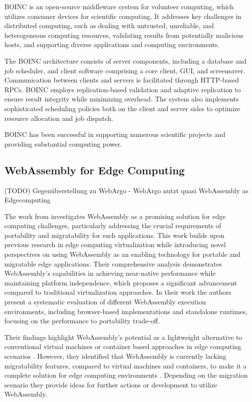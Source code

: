 \ac{BOINC} is an open-source middleware system for volunteer computing, which utilizes consumer devices for scientific computing. It addresses key challenges in distributed computing, such as dealing with untrusted, unreliable, and heterogeneous computing resources, validating results from potentially malicious hosts, and supporting diverse applications and computing environments. \cite{relatedwork:boinc1}

The BOINC architecture consists of server components, including a database and job scheduler, and client software comprising a core client, GUI, and screensaver. Communication between clients and servers is facilitated through HTTP-based RPCs. BOINC employs replication-based validation and adaptive replication to ensure result integrity while minimizing overhead. The system also implements sophisticated scheduling policies both on the client and server sides to optimize resource allocation and job dispatch. \cite{relatedwork:boinc1}

BOINC has been successful in supporting numerous scientific projects and providing substantial computing power. \cite{relatedwork:boinc1}

\subsection{WebAssembly for Edge Computing}
\label{subsec:background:related_work:wasmedgecomputing}
(TODO) Gegenüberstellung zu WebArgo - WebArgo nutzt quasi WebAssembly as Edgecomputing

The work from \citeauthor{relatedwork:wasmedgecomputing} \cite{relatedwork:wasmedgecomputing} investigates WebAssembly as a promising solution for edge computing challenges, particularly addressing the crucial requirements of portability and migratability for such applications. This work builds upon previous research in edge computing virtualization while introducing novel perspectives on using WebAssembly as an enabling technology for portable and migratable edge applications. Their comprehensive analysis demonstrates WebAssembly's capabilities in achieving near-native performance while maintaining platform independence, which proposes a significant advancement compared to traditional virtualization approaches. In their work the authors present a systematic evaluation of different WebAssembly execution environments, including browser-based implementations and standalone runtimes, focusing on the performance to portability trade-off. 

Their findings highlight WebAssembly's potential as a lightweight alternative to conventional virtual machines or container based approaches in edge computing scenarios \cite{relatedwork:wasmedgecomputing}. However, they identified that WebAssembly is currently lacking migratability features, compared to virtual machines and containers, to make it a complete solution for edge computing environments \cite{relatedwork:wasmedgecomputing}. Depending on the migration scenario they provide ideas for further actions or development to utilize WebAssembly.

